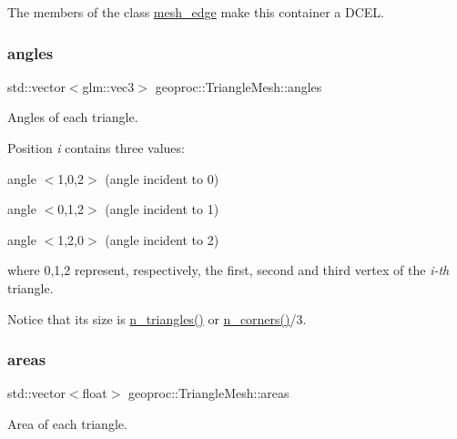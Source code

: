 The members of the class \hyperlink{classgeoproc_1_1mesh__edge}{mesh\+\_\+edge} make this container a D\+C\+EL. \mbox{\label{classgeoproc_1_1TriangleMesh_ab255af87d20d76ad84246560fa3579b3}} 
\subsubsection{\texorpdfstring{angles}{angles}}
{\footnotesize\ttfamily std\+::vector$<$glm\+::vec3$>$ geoproc\+::\+Triangle\+Mesh\+::angles\hspace{0.3cm}{\ttfamily [protected]}}



Angles of each triangle. 

Position {\itshape i} contains three values\+:
\begin{DoxyItemize}
\item angle $<$1,0,2$>$ (angle incident to 0)
\item angle $<$0,1,2$>$ (angle incident to 1)
\item angle $<$1,2,0$>$ (angle incident to 2)
\end{DoxyItemize}

where 0,1,2 represent, respectively, the first, second and third vertex of the {\itshape i-\/th} triangle.

Notice that its size is \hyperlink{classgeoproc_1_1TriangleMesh_ac6db86ebd1e12d187f4bd4fcbb1e0809}{n\+\_\+triangles()} or \hyperlink{classgeoproc_1_1TriangleMesh_a6b8c186ba032170de9d4f36b4c1d298b}{n\+\_\+corners()}/3. \mbox{\label{classgeoproc_1_1TriangleMesh_a684ecaaa03f1739856bba03167e51dd1}} 
\subsubsection{\texorpdfstring{areas}{areas}}
{\footnotesize\ttfamily std\+::vector$<$float$>$ geoproc\+::\+Triangle\+Mesh\+::areas\hspace{0.3cm}{\ttfamily [protected]}}



Area of each triangle. 

